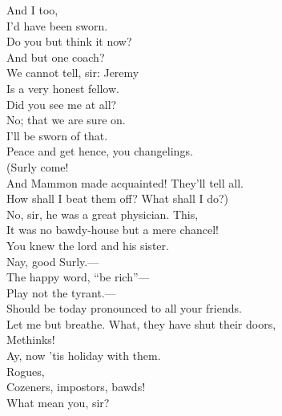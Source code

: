 \documentclass[a4paper,oneside,12pt]{memoir}
\begin{document}
\begin{drama*}
\neightwospeaks {} And I too,\\
I'd have been sworn.\\
\lovewitspeaks {} Do you but think it now?\\
And but one coach?\\
\neighthreespeaks {} We cannot tell, sir: Jeremy\\
Is a very honest fellow.\\
\facespeaks {} Did you see me at all?\\
\neighonespeaks No; that we are sure on.\\
\neightwospeaks {} I'll be sworn of that.\\
\lovewitspeaks Peace and get hence, you changelings.\\
\facespeaks {} (Surly come!\\
And Mammon made acquainted! They'll tell all.\\
How shall I beat them off? What shall I do?)\\
\surlyspeaks No, sir, he was a great physician. This,\\
It was no bawdy-house but a mere chancel!\\
You knew the lord and his sister.\\
\mammonspeaks {} Nay, good Surly.---\\
\surlyspeaks The happy word, ``be rich''---\\
\mammonspeaks {} Play not the tyrant.---\\
\surlyspeaks Should be today pronounced to all your friends.\\
\mammonspeaks Let me but breathe. What, they have shut their doors,\\
Methinks!\\
\surlyspeaks {} Ay, now 'tis holiday with them.\\
\mammonspeaks Rogues,\\
 Cozeners, impostors, bawds!\\
\facespeaks {} What mean you, sir?\\

\end{drama*}
\end{document}
